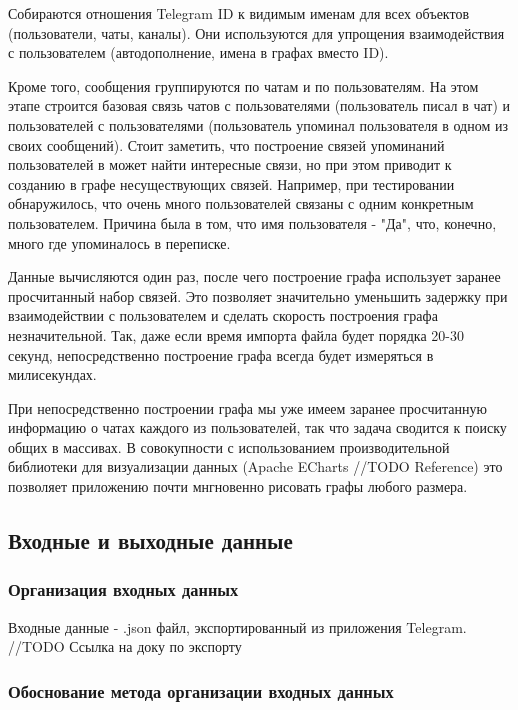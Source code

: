 Собираются отношения Telegram ID к видимым именам для всех объектов (пользователи, чаты, каналы).
Они используются для упрощения взаимодействия с пользователем (автодополнение, имена в графах вместо ID).

Кроме того, сообщения группируются по чатам и по пользователям. 
На этом этапе строится базовая связь чатов с пользователями (пользователь писал в чат) и пользователей с пользователями (пользователь упоминал пользователя в одном из своих сообщений).
Стоит заметить, что построение связей упоминаний пользователей в может найти интересные связи, но при этом приводит к созданию в графе несуществующих связей.
Например, при тестировании обнаружилось, что очень много пользователей связаны с одним конкретным пользователем. Причина была в том, что имя пользователя - "Да", что, конечно, много где упоминалось в переписке.

Данные вычисляются один раз, после чего построение графа использует заранее просчитанный набор связей.
Это позволяет значительно уменьшить задержку при взаимодействии с пользователем и сделать скорость построения графа незначительной.
Так, даже если время импорта файла будет порядка 20-30 секунд, непосредственно построение графа всегда будет измеряться в милисекундах.

При непосредственно построении графа мы уже имеем заранее просчитанную информацию о чатах каждого из пользователей, так что задача сводится к поиску общих в массивах.
В совокупности с использованием производительной библиотеки для визуализации данных (Apache ECharts //TODO Reference) это позволяет приложению почти мнгновенно рисовать графы любого размера. 

\subsection{Входные и выходные данные}

\subsubsection{Организация входных данных}

Входные данные - .json файл, экспортированный из приложения Telegram. //TODO Ссылка на доку по экспорту

\subsubsection{Обоснование метода организации входных данных}

